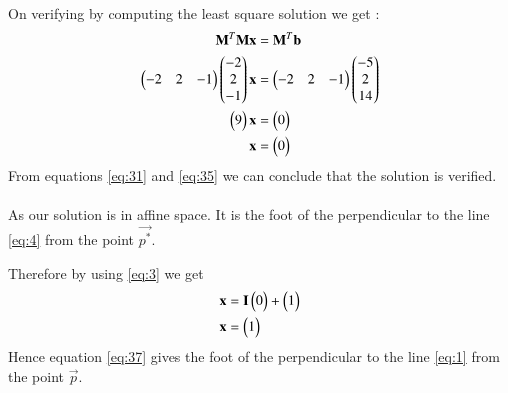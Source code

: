 \documentclass[journal,12pt,twocolumn]{IEEEtran}
\begin{document}
On verifying by computing the least square solution we get : 
\begin{align}
\mathbf{M}^T\mathbf{Mx} &= \mathbf{M}^T\mathbf{b}\\
\begin{pmatrix}-2&2&-1\end{pmatrix}\begin{pmatrix}-2\\2\\-1\end{pmatrix}\mathbf{x}&=\begin{pmatrix}-2&2&-1\end{pmatrix}\begin{pmatrix}-5\\2\\14\end{pmatrix}\\
\begin{pmatrix}9\end{pmatrix}\mathbf{x}&=\begin{pmatrix}0\end{pmatrix}\\
\mathbf{x}&=\begin{pmatrix}0\end{pmatrix}\label{eq:35}
\end{align}
From equations \eqref{eq:31} and \eqref{eq:35} we can conclude that the solution is verified.\\\\
As our solution is in affine space. It is the foot of the perpendicular to the line \eqref{eq:4} from the point $\vec{p^*}$.


Therefore by using \eqref{eq:3} we get
\begin{align}
    \mathbf{x}&=\mathbf{I}\begin{pmatrix}0\end{pmatrix}+\begin{pmatrix}1\end{pmatrix}\\
    \mathbf{x}&=\begin{pmatrix}1\end{pmatrix}\label{eq:37}
\end{align}
Hence equation \eqref{eq:37} gives the foot of the perpendicular to the line \eqref{eq:1} from the point $\vec{p}$. 
\end{document}
